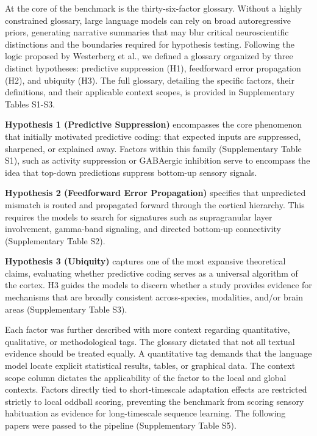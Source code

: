 \documentclass[12pt]{article}
\begin{document}
At the core of the benchmark is the thirty-six-factor glossary. Without a highly constrained glossary, large language models can rely on broad autoregressive priors, generating narrative summaries that may blur critical neuroscientific distinctions and the boundaries required for hypothesis testing\cite{ref58}. Following the logic proposed by Westerberg et al.\cite{ref34}, we defined a glossary organized by three distinct hypotheses: predictive suppression (H1), feedforward error propagation (H2), and ubiquity (H3). The full glossary, detailing the specific factors, their definitions, and their applicable context scopes, is provided in Supplementary Tables S1-S3.

\textbf{Hypothesis 1 (Predictive Suppression)} encompasses the core phenomenon that initially motivated predictive coding: that expected inputs are suppressed, sharpened, or explained away. Factors within this family (Supplementary Table S1), such as activity suppression or GABAergic inhibition serve to encompass the idea that top-down predictions suppress bottom-up sensory signals\cite{ref6,ref14}.




\textbf{Hypothesis 2 (Feedforward Error Propagation)} specifies that unpredicted mismatch is routed and propagated forward through the cortical hierarchy. This requires the models to search for signatures such as supragranular layer involvement\cite{ref59}, gamma-band signaling\cite{ref14}, and directed bottom-up connectivity\cite{ref24} (Supplementary Table S2).




\textbf{Hypothesis 3 (Ubiquity)} captures one of the most expansive theoretical claims, evaluating whether predictive coding serves as a universal algorithm of the cortex\cite{ref10,ref14}. H3 guides the models to discern whether a study provides evidence for mechanisms that are broadly consistent across-species, modalities, and/or brain areas (Supplementary Table S3).






Each factor was further described with more context regarding quantitative, qualitative, or methodological tags. The glossary dictated that not all textual evidence should be treated equally. A quantitative tag demands that the language model locate explicit statistical results, tables, or graphical data. The context scope column dictates the applicability of the factor to the local and global contexts. Factors directly tied to short-timescale adaptation effects are restricted strictly to local oddball scoring, preventing the benchmark from scoring sensory habituation as evidence for long-timescale sequence learning. The following papers were passed to the pipeline (Supplementary Table S5).
\end{document}
